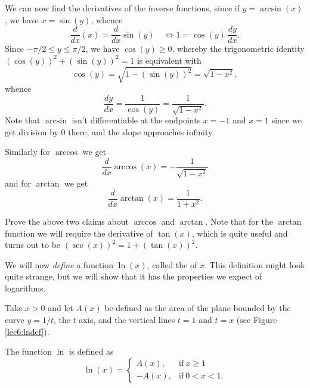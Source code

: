 \noindent
We can now find the derivatives of the inverse functions, since if $y = \arcsin(x)$, we have $x = \sin(y)$, whence
\[
	\frac{d}{d x} (x) = \frac{d}{d x} \sin(y) \quad \Longleftrightarrow 1 = \cos(y) \, \frac{d y}{d x}.
\]
Since $-\pi / 2 \leq y \leq \pi / 2$, we have $\cos(y) \geq 0$, whereby the trigonometric identity $(\cos(y))^2 + (\sin(y))^2 = 1$ is equivalent with
\[
	\cos(y) = \sqrt{1 - (\sin(y))^2} = \sqrt{1 - x^2},
\]
whence
\[
	\frac{d y}{d x} = \frac{1}{\cos(y)} = \frac{1}{\sqrt{1 - x^2}}.
\]
Note that $\arcsin$ isn't differentiable at the endpoints $x = -1$ and $x = 1$ since we get division by $0$ there, and the slope approaches infinity.

Similarly for $\arccos$ we get
\[
	\frac{d}{d x} \arccos(x) = - \frac{1}{\sqrt{1 - x^2}}
\]
and for $\arctan$ we get
\[
	\frac{d}{d x} \arctan(x) = \frac{1}{1 + x^2}.
\]

\begin{exercise}
	Prove the above two claims about $\arccos$ and $\arctan$.
	Note that for the $\arctan$ function we will require the derivative of $\tan(x)$, which is quite useful and turns out to be $(\sec(x))^2 = 1 + (\tan(x))^2$.
\end{exercise}



We will now \emph{define} a function $\ln(x)$, called the  of $x$.
This definition might look quite strange, but we will show that it has the properties we expect of logarithms.

\begin{definition}
	Take $x > 0$ and let $A(x)$ be defined as the area of the plane bounded by the curve $y = 1/t$, the $t$ axis, and the vertical lines $t = 1$ and $t = x$ (see Figure \ref{lec6:lndef}).

	The function $\ln$ is defined as
	\[
		\ln(x) = \begin{cases}
		A(x), & \text{if}~ x \geq 1 \\
		- A(x), & \text{if}~ 0 < x < 1.
		\end{cases}
	\]
\end{definition}

